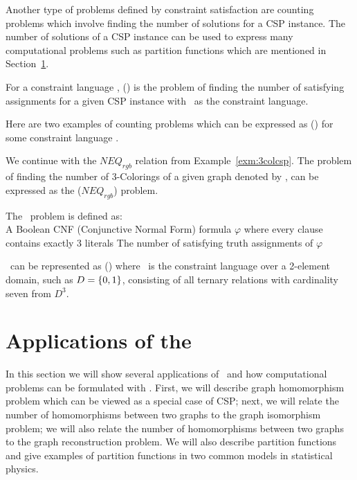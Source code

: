 Another type of problems defined by constraint satisfaction are
counting problems which involve finding the number of solutions for a CSP instance.
The number of solutions of a CSP instance can be used to express many computational problems
such as partition functions which are mentioned in Section~\ref{sec:appl}.

\begin{defi}[\ccsp(\mrelset)] 
For a constraint language \mrelset,
\ccsp(\mrelset) is the problem of finding the number of satisfying assignments for a
given CSP instance with \mrelset\ as the constraint language.
\end{defi}

Here are two examples of counting problems which can be expressed as \ccsp(\mrelset) for some
constraint language \mrelset\@.
\begin{example}[\ctcol]
We continue with the \(NEQ_{rgb}\) relation from Example~\ref{exm:3colcsp}\@.
The problem of finding the number of 3-Colorings of a given graph denoted by 
\ctcol, can be expressed as the \ccsp(\(NEQ_{rgb}\)) problem.
\end{example}

\begin{example}\label{example:c3sat}
The \ctsat\ problem is defined as:\\
\pnndef%
{A Boolean CNF (Conjunctive Normal Form) formula \(\varphi\) 
where every clause contains exactly 3 literals}
{The number of satisfying truth assignments of \(\varphi\)}

\ctsat\ can be represented as \ccsp(\mrelset) where \mrelset\ is the constraint language
over a 2-element domain, such as \(D=\{{{0,1}}\}\), consisting of all 
ternary relations with cardinality seven from \(D^3\).
\end{example}
\section{Applications of the \ccsp} \label{sec:appl}
In this section we will show several applications of \ccsp\ and how computational problems
can be formulated with \ccsp\@. First, we will describe graph
homomorphism problem which can be viewed as a special case of CSP; next, we will relate
the number of homomorphisms between two graphs to the graph isomorphism problem;
we will also relate the number of homomorphisms between two graphs to
the graph reconstruction problem. We will also describe partition functions
and give examples of partition functions in two common models in statistical physics.

